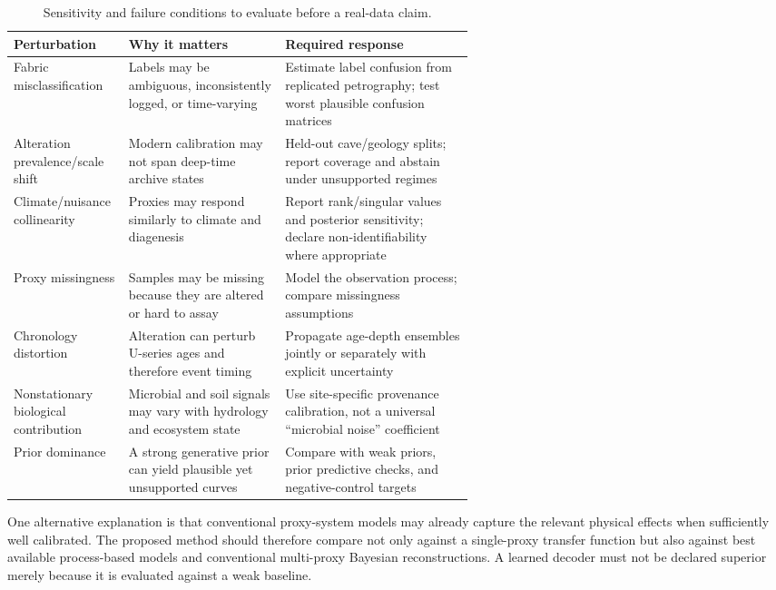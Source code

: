 \documentclass[11pt,a4paper]{article}
\begin{document}
\begin{table}[!htbp]\centering\small
\caption{Sensitivity and failure conditions to evaluate before a real-data claim.}\label{tab:failure}
\begin{tabularx}{\linewidth}{p{0.25\linewidth}p{0.34\linewidth}X}\toprule
Perturbation & Why it matters & Required response \\\midrule
Fabric misclassification & Labels may be ambiguous, inconsistently logged, or time-varying & Estimate label confusion from replicated petrography; test worst plausible confusion matrices \\
Alteration prevalence/scale shift & Modern calibration may not span deep-time archive states & Held-out cave/geology splits; report coverage and abstain under unsupported regimes \\
Climate/nuisance collinearity & Proxies may respond similarly to climate and diagenesis & Report rank/singular values and posterior sensitivity; declare non-identifiability where appropriate \\
Proxy missingness & Samples may be missing because they are altered or hard to assay & Model the observation process; compare missingness assumptions \\
Chronology distortion & Alteration can perturb U-series ages and therefore event timing & Propagate age-depth ensembles jointly or separately with explicit uncertainty \\
Nonstationary biological contribution & Microbial and soil signals may vary with hydrology and ecosystem state & Use site-specific provenance calibration, not a universal “microbial noise” coefficient \\
Prior dominance & A strong generative prior can yield plausible yet unsupported curves & Compare with weak priors, prior predictive checks, and negative-control targets \\
\bottomrule\end{tabularx}\end{table}

One alternative explanation is that conventional proxy-system models may already capture the relevant physical effects when sufficiently well calibrated. The proposed method should therefore compare not only against a single-proxy transfer function but also against best available process-based models and conventional multi-proxy Bayesian reconstructions. A learned decoder must not be declared superior merely because it is evaluated against a weak baseline.
\end{document}
